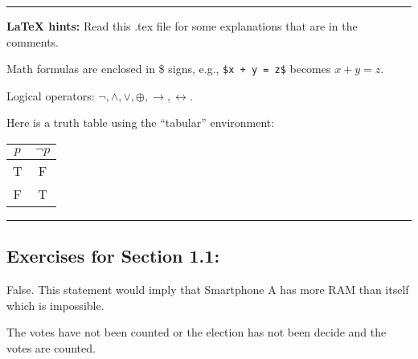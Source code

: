 \documentclass[12pt]{article}  %
\newcommand{\NOT}{\neg}
\newcommand{\AND}{\wedge}
\newcommand{\OR}{\vee}
\newcommand{\XOR}{\oplus}
\newcommand{\IMPLIES}{\rightarrow}
\newcommand{\IFF}{\leftrightarrow}
\begin{document}
\rule{6in}{.1pt}       %
\clearpage
\noindent
{\bf LaTeX hints:}  Read this .tex file for some explanations that are in
the comments.

Math formulas are enclosed in \$ signs, e.g., {\tt \$x + y = z\$}
becomes $x + y = z$.

Logical operators: $\NOT, \AND, \OR, \XOR, \IMPLIES, \IFF$.

Here is a truth table using the ``tabular'' environment:

\begin{center}
\begin{tabular}{|c|c|}  %
\hline                  %
$p$ & $\NOT p$ \\       %
\hline
\hline
T & F \\
\hline
F & T \\
\hline
\end{tabular}
\end{center}



\rule{6in}{.1pt}       %


\subsection*{Exercises for Section 1.1:}     

\newline
False.\newline
This statement would imply that Smartphone A has more RAM than itself which is impossible.

\newline
The votes have not been counted or the election has not been decide and the votes are counted.
\end{document}

